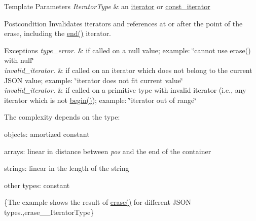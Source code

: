 \begin{DoxyTemplParams}{Template Parameters}
{\em Iterator\+Type} & an \hyperlink{classnlohmann_1_1basic__json_a099316232c76c034030a38faa6e34dca}{iterator} or \hyperlink{classnlohmann_1_1basic__json_a41a70cf9993951836d129bb1c2b3126a}{const\+\_\+iterator}\\
\hline
\end{DoxyTemplParams}
\begin{DoxyPostcond}{Postcondition}
Invalidates iterators and references at or after the point of the erase, including the {\ttfamily \hyperlink{classnlohmann_1_1basic__json_a13e032a02a7fd8a93fdddc2fcbc4763c}{end()}} iterator.
\end{DoxyPostcond}

\begin{DoxyExceptions}{Exceptions}
{\em type\+\_\+error.} & if called on a {\ttfamily null} value; example\+: {\ttfamily \char`\"{}cannot use
erase() with null\char`\"{}} \\
\hline
{\em invalid\+\_\+iterator.} & if called on an iterator which does not belong to the current J\+S\+ON value; example\+: {\ttfamily \char`\"{}iterator does not fit current
value\char`\"{}} \\
\hline
{\em invalid\+\_\+iterator.} & if called on a primitive type with invalid iterator (i.\+e., any iterator which is not {\ttfamily \hyperlink{classnlohmann_1_1basic__json_a0ff28dac23f2bdecee9564d07f51dcdc}{begin()}}); example\+: {\ttfamily \char`\"{}iterator
out of range\char`\"{}}\\
\hline
\end{DoxyExceptions}
The complexity depends on the type\+:
\begin{DoxyItemize}
\item objects\+: amortized constant
\item arrays\+: linear in distance between {\itshape pos} and the end of the container
\item strings\+: linear in the length of the string
\item other types\+: constant
\end{DoxyItemize}

\{The example shows the result of {\ttfamily \hyperlink{classnlohmann_1_1basic__json_a068a16e76be178e83da6a192916923ed}{erase()}} for different J\+S\+ON types.,erase\+\_\+\+\_\+\+Iterator\+Type\}


